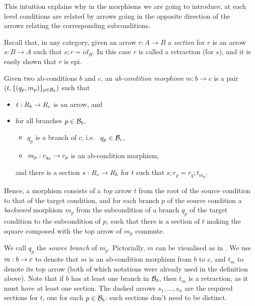 This intuition explains why in the morphisms we are going to introduce, at each level conditions are related by arrows going in the opposite direction of the arrows relating the corresponding subconditions.  

Recall that, in any category, given an arrow $r: A \to B$ a \emph{section} for $r$ is an arrow $s: B \to A$ such that $s;r = id_B$. In this case $r$ is called a retraction (for $s$), and it is easily shown that $r$ is epi.

\begin{definition}
  Given two ab-conditions $b$ and $c$, an \emph{ab-condition morphism} $m: b \to c$
  is a pair $(t,\{{(q_p,m_p)}\}_{p\in \mathcal{B}_b})$ such that   
  \begin{itemize}
    \item $t:R_b\rightarrow R_c$ is an arrow, and  
  \item  for all branches $p\in \mathcal{B}_b$, 
  \begin{itemize}
    \item $q_p$ is a branch of $c$, i.e.~ $q_p \in \mathcal{B}_c$,
    \item $m_p:c_{q_p}\rightarrow c_p$ is an ab-condition morphism,
  \end{itemize}
    
    and there is a section $s:R_c\rightarrow R_b$ for $t$ such that $s; r_p = r_q;t_{m_p}$.
  
\end{itemize}
\end{definition}
%
Hence, a morphism consists of a \emph{top} arrow $t$ from the root of the source condition to that of the target condition, and for each branch $p$ of the source condition a \emph{backward} morphism $m_p$ from the subcondition of a branch $q_p$ of the target condition to the subcondition of $p$, such that there is a section of $t$ making the square composed with the top arrow of $m_p$ commute. 

We call $q_p$ the \emph{source branch} of $m_p$. Pictorially, $m$ can be visualised as in . We use $m:b\rightarrow c$ to denote that $m$ is an ab-condition morphism from $b$ to $c$, and $t_m$ to denote its top arrow (both of which notations were already used in the definition above). Note that if $b$ has at least one branch in $\mathcal{B}_b$, then $t_m$ is a retraction, as it must have at least one section.  The dashed arrows $s_1, \ldots, s_n$ are the required sections for $t$, one for each $p\in \mathcal{B}_b$: such sections don't need to be distinct.  

